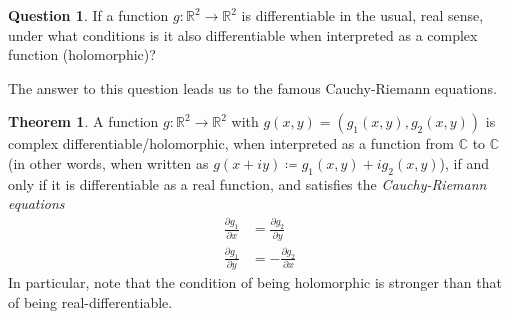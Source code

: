\documentclass[aps,pra,showpacs,notitlepage,onecolumn,superscriptaddress,nofootinbib]{revtex4-1}
\theoremstyle{definition}
\newtheorem{theorem}{Theorem}[section]
\newtheorem{question}{Question}[section]
\newcommand{\hhrulefill}{\hspace{-1.5em} \hrulefill}
\begin{document}
\hhrulefill

\begin{question}
If a function $g : \mathbb{R}^2 \rightarrow \mathbb{R}^2$ is differentiable in the usual, real sense, under what conditions is it also differentiable when interpreted as a complex function (holomorphic)?
\end{question}

\hhrulefill

\noindent The answer to this question leads us to the famous Cauchy-Riemann equations.

\begin{theorem}
  A function $g : \mathbb{R}^2 \rightarrow \mathbb{R}^2$ with $g(x, y) = (g_1(x, y), g_2(x, y))$ is complex differentiable/holomorphic, when interpreted as a function from $\mathbb{C}$ to $\mathbb{C}$ (in other words, when written as $g(x + iy) \coloneqq g_1(x, y) + i g_2(x, y)$),
  if and only if it is differentiable as a real function, and satisfies the \emph{Cauchy-Riemann equations}
  \begin{align}
    \frac{\partial g_1}{\partial x} &= \frac{\partial g_2}{\partial y} \\
    \frac{\partial g_1}{\partial y} &= -\frac{\partial g_2}{\partial x}
  \end{align}
  In particular, note that the condition of being holomorphic is stronger than that of being real-differentiable.
\end{theorem}
\end{document}
